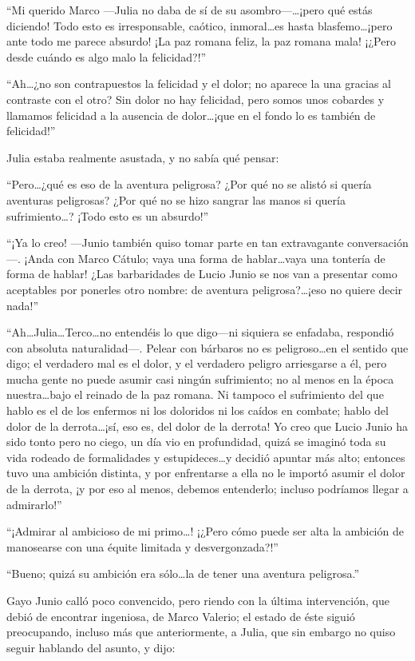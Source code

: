 \documentclass[11pt,openany]{book}
\begin{document}
“Mi querido Marco —Julia no daba de sí de su asombro—\dots ¡pero qué estás diciendo! Todo esto es irresponsable, caótico, inmoral\dots es hasta blasfemo\dots ¡pero ante todo me parece absurdo! ¡La paz romana feliz, la paz romana mala! ¡¿Pero desde cuándo es algo malo la felicidad?!” 

“Ah\dots ¿no son contrapuestos la felicidad y el dolor; no aparece la una gracias al contraste con el otro? Sin dolor no hay felicidad, pero somos unos cobardes y llamamos felicidad a la ausencia de dolor\dots ¡que en el fondo lo es también de felicidad!” 

Julia estaba realmente asustada, y no sabía qué pensar: 

“Pero\dots ¿qué es eso de la aventura peligrosa? ¿Por qué no se alistó si quería aventuras peligrosas? ¿Por qué no se hizo sangrar las manos si quería sufrimiento\dots? ¡Todo esto es un absurdo!” 

“¡Ya lo creo! —Junio también quiso tomar parte en tan extravagante conversación—. ¡Anda con Marco Cátulo; vaya una forma de hablar\dots vaya una tontería de forma de hablar! ¿Las barbaridades de Lucio Junio se nos van a presentar como aceptables por ponerles otro nombre: de aventura peligrosa?\dots ¡eso no quiere decir nada!” 

“Ah\dots Julia\dots Terco\dots no entendéis lo que digo—ni siquiera se enfadaba, respondió con absoluta naturalidad—. Pelear con bárbaros no es peligroso\dots en el sentido que digo; el verdadero mal es el dolor, y el verdadero peligro arriesgarse a él, pero mucha gente no puede asumir casi ningún sufrimiento; no al menos en la época nuestra\dots bajo el reinado de la paz romana. Ni tampoco el sufrimiento del que hablo es el de los enfermos ni los doloridos ni los caídos en combate; hablo del dolor de la derrota\dots ¡sí, eso es, del dolor de la derrota! Yo creo que Lucio Junio ha sido tonto pero no ciego, un día vio en profundidad, quizá se imaginó toda su vida rodeado de formalidades y estupideces\dots y decidió apuntar más alto; entonces tuvo una ambición distinta, y por enfrentarse a ella no le importó asumir el dolor de la derrota, ¡y por eso al menos, debemos entenderlo; incluso podríamos llegar a admirarlo!” 

“¡Admirar al ambicioso de mi primo\dots! ¡¿Pero cómo puede ser alta la ambición de manosearse con una équite limitada y desvergonzada?!” 

“Bueno; quizá su ambición era sólo\dots la de tener una aventura peligrosa.” 

Gayo Junio calló poco convencido, pero riendo con la última intervención, que debió de encontrar ingeniosa, de Marco Valerio; el estado de éste siguió preocupando, incluso más que anteriormente, a Julia, que sin embargo no quiso seguir hablando del asunto, y dijo: 
\end{document}
